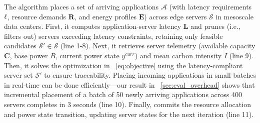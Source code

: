 The algorithm places a set of arriving applications $\mathcal{A}$ (with latency requirements $\boldmath\ell$, resource demands $\mathbf{R}$, and energy profiles $\mathbf{E}$) across edge servers $\mathcal{S}$ in mesoscale data centers. First, it computes application-server latency $\mathbf{L}$ and prunes (i.e., filters out) servers exceeding latency constraints, retaining only feasible candidates $\mathcal{S}' \in \mathcal{S}$ (line 1-8). Next, it retrieves server telemetry (available capacity $\mathbf{C}$, base power $B$, current power state $y^{curr}$) and  mean carbon intensity $\bar{I}$ (line 9). Then, it solves the optimization in ~\autoref{eq:objective} using the latency-compliant server set $\mathcal{S}'$ to ensure traceability. 
Placing incoming applications in small batches in real-time can be done efficiently---our  result in ~\autoref{sec:eval_overhead} shows that  incremental placement of a batch of 50 newly arriving applications across 400 servers completes in 3 seconds (line 10). Finally, \proposedsystem commits the resource allocation and power state transition, updating server states for the next iteration (line 11).







